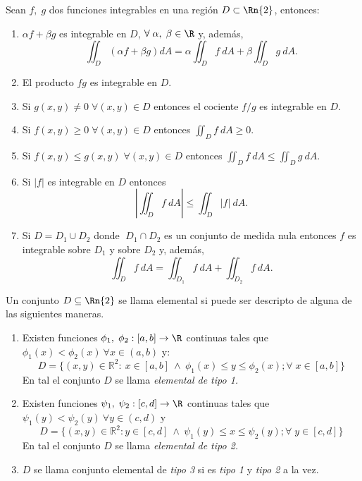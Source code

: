 \begin{propertie}
    Sean $f,\;g$ dos funciones integrables en una regi\'on $D\subset\Rn{2}$, entonces:
    \begin{enumerate}
        \item[i.] $\alpha f+\beta g$ es integrable en $D$, $\forall\;\alpha,\;\beta\in\R$ y, adem\'as,
        \[
            \iint_D \left(\alpha f+\beta g\right)dA=\alpha\iint_D f\:dA+\beta\iint_D g\:dA.
        \]
        \item[ii.] El producto $fg$ es integrable en $D$.
        \item[iii.] Si $g(x,y) \neq 0\;\forall(x,y)\in D$ entonces el cociente $f/g$ es integrable en $D$.
        \item[iv.] Si $f(x,y)\geq 0 \;\forall(x,y)\in D$ entonces  $\iint_D f\:dA\geq0$.
        \item[v.]Si $f(x,y)\leq g(x,y)  \;\forall(x,y)\in D$ entonces $\iint_D f\:dA\leq\iint_D g\:dA.$
        \item[vi.]Si $|f|$ es integrable en $D$ entonces 
        \[
            \left|\iint_D f\:dA\right|\leq\iint_D|f|\:dA.  
        \]    
        \item[vii.] Si $D=D_1\cup D_2$ donde $\;D_1\cap D_2$ es un conjunto de medida nula  entonces   $f$ es integrable sobre $D_1$ y sobre $D_2$ y, adem\'as,  
        \[
            \iint_D f\:dA=\iint_{D_1} f\:dA+\iint_{D_2}f\:dA.    
        \]
    \end{enumerate}
\end{propertie}

\begin{definition}\label{conj_elem}  Un conjunto  $D\subseteq\Rn{2}$ se llama elemental si  puede ser descripto de alguna de las siguientes maneras. 
   
    \begin{enumerate}
    \item[i.]  Existen funciones $\phi_1,\;\phi_2:[a,b]\to\R$  continuas  tales que $ \phi_1(x) < \phi_2(x) \: \forall x \in (a,b) $  y:
    \[
     D = \{ (x,y) \in \mathbb{R}^{2}: \:   x\in[a,b] \: \land \: \phi_1(x)\leq y\leq\phi_2(x) ;\forall\;x\in[a,b] \}  
    \]   En tal  el conjunto $D$ se llama  \textit{elemental de tipo 1.} 
   
    \item[ii.]  Existen funciones $\psi_1,\;\psi_2:[c,d]\to\R$  continuas tales que $ \psi_1(y) < \psi_2(y) \: \forall y \in (c,d)$ y 
    \[
     D = \{ (x,y) \in \mathbb{R}^{2}:   y\in[c,d] \: \land \:  \psi_1(y)\leq x\leq\psi_2(y) ;\forall\;y\in[c,d] \}  
    \]
     En tal  el conjunto $D$  se llama  \textit{elemental de tipo 2.} 
    
    \item[iii.] $D$ se llama conjunto elemental de \textit{tipo 3} si es \textit{tipo 1} y \textit{tipo 2} a la vez.
    
    
    
    \end{enumerate}
\end{definition}

